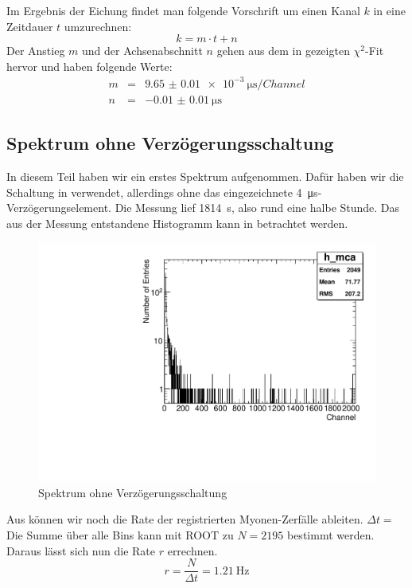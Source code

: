Im Ergebnis der Eichung findet man folgende Vorschrift um einen Kanal $k$ in
eine Zeitdauer $t$ umzurechnen:
\begin{equation}
  k = m \cdot t + n
\end{equation}
Der Anstieg $m$ und der Achsenabschnitt $n$ gehen aus dem in 
gezeigten $\chi^2$-Fit hervor und haben folgende Werte:
\begin{eqnarray}
  m &=& \SI{9.65(1)e-3}{\micro\second\per{Channel}} \\
  n &=& \SI{-0.01(1)}{\micro\second}
\end{eqnarray}

\subsection{Spektrum ohne Verzögerungsschaltung}

In diesem Teil haben wir ein erstes Spektrum aufgenommen. Dafür haben wir die
Schaltung in  verwendet, allerdings ohne das
eingezeichnete \SI{4}{\micro\second}-Verzögerungselement. Die Messung lief
\SI{1814}{\second}, also rund eine halbe Stunde. Das aus der Messung
entstandene Histogramm kann in  betrachtet werden.

\begin{figure}[ht!]
  \centering
 
\includegraphics[width=\columnwidth,keepaspectratio=true]{eichhistohneverzoegerung}
  \caption{Spektrum ohne Verzögerungsschaltung}
  \label{fig:ohne_verzoegerung}
\end{figure}

Aus  können wir noch die Rate der registrierten 
Myonen-Zerfälle ableiten. $Δt = $ Die Summe über alle Bins kann mit ROOT zu $N = 2195$ bestimmt
werden. Daraus lässt sich nun die Rate $r$ errechnen.
\begin{equation}
 r = \frac{N}{Δt} = \SI{1.21}{\hertz}
\end{equation}

